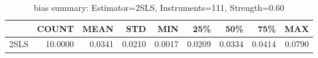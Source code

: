 \begin{table}[ht]
\centering
\caption{bias summary: Estimator=2SLS, Instruments=111, Strength=0.60}
\begin{tabular}{lrrrrrrrr}
\toprule
 & COUNT & MEAN & STD & MIN & 25\% & 50\% & 75\% & MAX \\
\midrule
2SLS & 10.0000 & 0.0341 & 0.0210 & 0.0017 & 0.0209 & 0.0334 & 0.0414 & 0.0790 \\
\bottomrule
\end{tabular}
\end{table}
